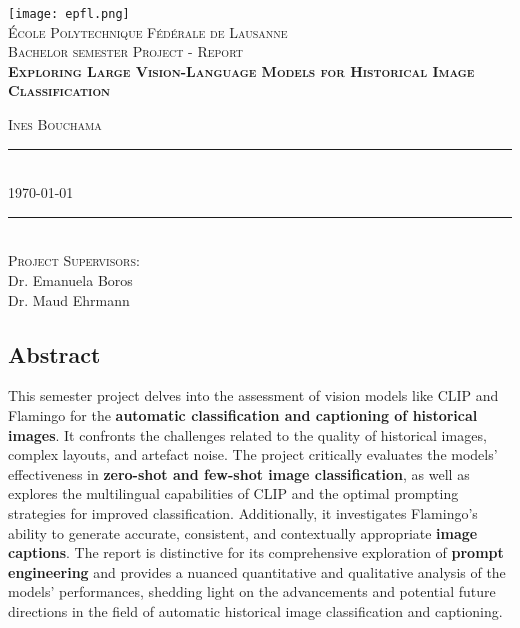 \documentclass[11pt,titlepage]{report}
\begin{document}
\begin{titlepage}
	\centering
    \texttt{[image: epfl.png]}\\[0.25cm] 	%
    \textsc{\LARGE École Polytechnique Fédérale de Lausanne}\\ \vspace{\fill}
    \textsc{\LARGE Bachelor semester Project - Report}\\ \vspace{\fill}
    \textbf{\textsc{\fontsize{25}{20}\selectfont Exploring Large Vision-Language Models for Historical Image Classification}}\\ \vspace{\fill}		

	\textsc{\LARGE Ines Bouchama}\\[0.4cm]
    \rule{\linewidth}{0.2 mm} \\[0.5 cm]
    {\Large \today}\\
	\rule{\linewidth}{0.2 mm} \\[0.5 cm]
	\textsc{\Large Project Supervisors:}\\[0.2cm]
    {\Large Dr. Emanuela Boros} \\[0.2cm]
    {\Large Dr. Maud Ehrmann}

\end{titlepage}
\restoregeometry

\thispagestyle{numberonly}
\begin{summary}
\section*{Abstract}

This semester project delves into the assessment of vision models like CLIP and Flamingo for the \textbf{automatic classification and captioning of historical images}. It confronts the challenges related to the quality of historical images, complex layouts, and artefact noise. The project critically evaluates the models' effectiveness in \textbf{zero-shot and few-shot image classification}, as well as explores the multilingual capabilities of CLIP and the optimal prompting strategies for improved classification. Additionally, it investigates Flamingo’s ability to generate accurate, consistent, and contextually appropriate \textbf{image captions}. The report is distinctive for its comprehensive exploration of \textbf{prompt engineering} and provides a nuanced quantitative and qualitative analysis of the models' performances, shedding light on the advancements and potential future directions in the field of automatic historical image classification and captioning.

\end{summary}
\end{document}
